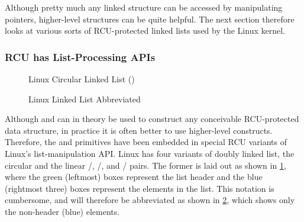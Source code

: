 Although pretty much any linked structure can be accessed by manipulating
pointers, higher-level structures can be quite helpful.
The next section therefore looks at various sorts of RCU-protected
linked lists used by the Linux kernel.

\subsubsection{RCU has List-Processing APIs}
\label{sec:defer:RCU has List-Processing APIs}

\begin{figure}
\centering
{}
\caption{Linux Circular Linked List ()}
\label{fig:defer:Linux Circular Linked List (list)}
\end{figure}

\begin{figure}
\centering
{}
\caption{Linux Linked List Abbreviated}
\label{fig:defer:Linux Linked List Abbreviated}
\end{figure}

Although  and
 can in theory be used to construct any
conceivable RCU-protected data structure, in practice it is often better
to use higher-level constructs.
Therefore, the  and
primitives have been embedded in special RCU variants of Linux's
list-manipulation API\@.
Linux has four variants of doubly linked list, the circular
 and the linear
/,
/, and
/
pairs.
The former is laid out as shown in
\cref{fig:defer:Linux Circular Linked List (list)},
where the green (leftmost) boxes represent the list header and the blue
(rightmost three) boxes represent the elements in the list.
This notation is cumbersome, and will therefore be abbreviated as shown in
\cref{fig:defer:Linux Linked List Abbreviated},
which shows only the non-header (blue) elements.

